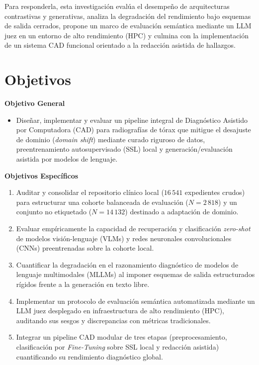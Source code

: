 \documentclass[../main.tex]{subfiles} %
\begin{document}
Para responderla, esta investigación evalúa el desempeño de arquitecturas contrastivas y generativas, analiza la degradación del rendimiento bajo esquemas de salida cerrados, propone un marco de evaluación semántica mediante un LLM juez en un entorno de alto rendimiento (HPC) y culmina con la implementación de un sistema CAD funcional orientado a la redacción asistida de hallazgos.

\section*{Objetivos}

\textbf{Objetivo General}
\begin{itemize}
    \item Diseñar, implementar y evaluar un pipeline integral de Diagnóstico Asistido por Computadora (CAD) para radiografías de tórax que mitigue el desajuste de dominio (\textit{domain shift}) mediante curado riguroso de datos, preentrenamiento autosupervisado (SSL) local y generación/evaluación asistida por modelos de lenguaje.
\end{itemize}

\textbf{Objetivos Específicos}
\begin{enumerate}
    \item Auditar y consolidar el repositorio clínico local ($16\,541$ expedientes crudos) para estructurar una cohorte balanceada de evaluación ($N = 2\,818$) y un conjunto no etiquetado ($N = 14\,132$) destinado a adaptación de dominio.
    \item Evaluar empíricamente la capacidad de recuperación y clasificación \textit{zero-shot} de modelos visión-lenguaje (VLMs) y redes neuronales convolucionales (CNNs) preentrenadas sobre la cohorte local.
    \item Cuantificar la degradación en el razonamiento diagnóstico de modelos de lenguaje multimodales (MLLMs) al imponer esquemas de salida estructurados rígidos frente a la generación en texto libre.
    \item Implementar un protocolo de evaluación semántica automatizada mediante un LLM juez desplegado en infraestructura de alto rendimiento (HPC), auditando sus sesgos y discrepancias con métricas tradicionales.
    \item Integrar un pipeline CAD modular de tres etapas (preprocesamiento, clasificación por \textit{Fine-Tuning} sobre SSL local y redacción asistida) cuantificando su rendimiento diagnóstico global.
\end{enumerate}
\end{document}
